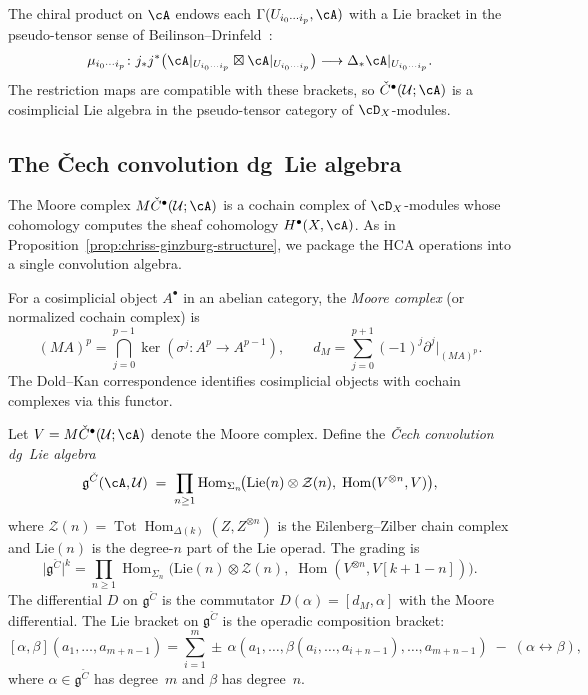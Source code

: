 The chiral product on $\cA$ endows each
$\Gamma(U_{i_0\cdots i_p},\cA)$ with a Lie bracket in the
pseudo-tensor sense of Beilinson--Drinfeld~\cite{BD04}:
\[
\mu_{i_0\cdots i_p}\colon
 j_*j^*\bigl(\cA|_{U_{i_0\cdots i_p}}
 \boxtimes \cA|_{U_{i_0\cdots i_p}}\bigr)
 \longrightarrow
 \Delta_*\cA|_{U_{i_0\cdots i_p}}.
\]
The restriction maps are compatible with these brackets, so
$\check{C}^\bullet(\mathcal{U};\cA)$ is a cosimplicial Lie algebra
in the pseudo-tensor category of $\cD_X$-modules.

\subsection{The \v{C}ech convolution dg~Lie algebra}
\label{subsec:cech-convolution}

The Moore complex $M\check{C}^\bullet(\mathcal{U};\cA)$ is a cochain
complex of $\cD_X$-modules whose cohomology computes the sheaf
cohomology $H^\bullet(X,\cA)$. As in
Proposition~\ref{prop:chriss-ginzburg-structure}, we
package the HCA operations into a single convolution algebra.

\begin{definition}
\label{def:moore-complex}
For a cosimplicial object $A^\bullet$ in an abelian category, the
\emph{Moore complex} (or normalized cochain complex) is
\[
(MA)^p = \bigcap_{j=0}^{p-1}\ker(\sigma^j\colon A^p \to A^{p-1}),
\qquad
d_M = \sum_{j=0}^{p+1}(-1)^j\partial^j\big|_{(MA)^p}.
\]
The Dold--Kan correspondence identifies cosimplicial objects with
cochain complexes via this functor.
\end{definition}

\begin{definition}
\label{def:cech-convolution}
Let $V = M\check{C}^\bullet(\mathcal{U};\cA)$ denote the Moore
complex. Define the \emph{\v{C}ech convolution dg~Lie algebra}
\[
\mathfrak{g}^{\check{C}}(\cA,\mathcal{U})
 \;=\;
 \prod_{n \geq 1}
 \operatorname{Hom}_{\Sigma_n}\!\bigl(
 \mathrm{Lie}(n) \otimes \mathcal{Z}(n),\;
 \operatorname{Hom}(V^{\otimes n},V)
 \bigr),
\]
where $\mathcal{Z}(n) =
\operatorname{Tot}\operatorname{Hom}_{\Delta(k)}(Z,Z^{\otimes n})$
is the Eilenberg--Zilber chain complex and $\mathrm{Lie}(n)$ is
the degree-$n$ part of the Lie operad.
The grading is
\[
\bigl|\mathfrak{g}^{\check{C}}\bigr|^k
 = \prod_{n \geq 1}
 \operatorname{Hom}_{\Sigma_n}\!\bigl(
 \mathrm{Lie}(n) \otimes \mathcal{Z}(n),\;
 \operatorname{Hom}(V^{\otimes n}, V[k+1-n])
 \bigr).
\]
The differential $D$ on $\mathfrak{g}^{\check{C}}$ is the
commutator $D(\alpha) = [d_M, \alpha]$ with the Moore differential.
The Lie bracket on $\mathfrak{g}^{\check{C}}$ is the operadic
composition bracket:
\[
[\alpha,\beta](a_1,\ldots,a_{m+n-1})
 = \sum_{i=1}^m \pm\,
 \alpha(a_1,\ldots,\beta(a_i,\ldots,a_{i+n-1}),\ldots,a_{m+n-1})
 \;-\; (\alpha \leftrightarrow \beta),
\]
where $\alpha \in \mathfrak{g}^{\check{C}}$ has degree~$m$ and
$\beta$ has degree~$n$.
\end{definition}

